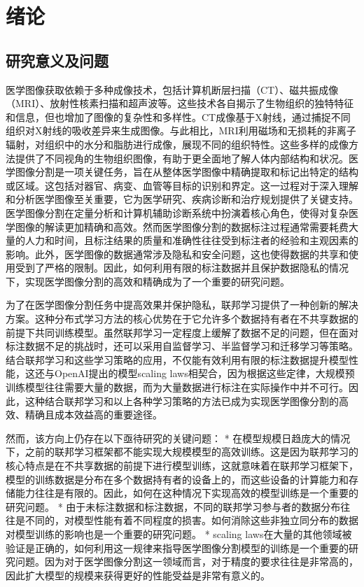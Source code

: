 \chapter{绪论}
\label{chap:intro}
\section{研究意义及问题}

医学图像获取依赖于多种成像技术，包括计算机断层扫描（CT）\supercite{Ludwig2008,JournalNucMedTech2023}、磁共振成像（MRI）、放射性核素扫描和超声波等。这些技术各自揭示了生物组织的独特特征和信息，但也增加了图像的复杂性和多样性。CT成像基于X射线，通过捕捉不同组织对X射线的吸收差异来生成图像。与此相比，MRI利用磁场和无损耗的非离子辐射，对组织中的水分和脂肪进行成像，展现不同的组织特性。这些多样的成像方法提供了不同视角的生物组织图像，有助于更全面地了解人体内部结构和状况。医学图像分割是一项关键任务，旨在从整体医学图像中精确提取和标记出特定的结构或区域。这包括对器官、病变、血管等目标的识别和界定。这一过程对于深入理解和分析医学图像至关重要，它为医学研究、疾病诊断和治疗规划提供了关键支持。医学图像分割在定量分析和计算机辅助诊断系统中扮演着核心角色，使得对复杂医学图像的解读更加精确和高效。然而医学图像分割的数据标注过程通常需要耗费大量的人力和时间，且标注结果的质量和准确性往往受到标注者的经验和主观因素的影响。此外，医学图像的数据通常涉及隐私和安全问题，这也使得数据的共享和使用受到了严格的限制。因此，如何利用有限的标注数据并且保护数据隐私的情况下，实现医学图像分割的高效和精确成为了一个重要的研究问题。

为了在医学图像分割任务中提高效果并保护隐私，联邦学习提供了一种创新的解决方案。这种分布式学习方法的核心优势在于它允许多个数据持有者在不共享数据的前提下共同训练模型。虽然联邦学习一定程度上缓解了数据不足的问题，但在面对标注数据不足的挑战时，还可以采用自监督学习、半监督学习和迁移学习等策略。结合联邦学习和这些学习策略的应用，不仅能有效利用有限的标注数据提升模型性能，这还与OpenAI提出的模型scaling laws相契合，因为根据这些定律，大规模预训练模型往往需要大量的数据，而为大量数据进行标注在实际操作中并不可行。因此，这种结合联邦学习和以上各种学习策略的方法已成为实现医学图像分割的高效、精确且成本效益高的重要途径。

然而，该方向上仍存在以下亟待研究的关键问题：
* 在模型规模日趋庞大的情况下，之前的联邦学习框架都不能实现大规模模型的高效训练。这是因为联邦学习的核心特点是在不共享数据的前提下进行模型训练，这就意味着在联邦学习框架下，模型的训练数据是分布在多个数据持有者的设备上的，而这些设备的计算能力和存储能力往往是有限的。因此，如何在这种情况下实现高效的模型训练是一个重要的研究问题。
* 由于未标注数据和标注数据，不同的联邦学习参与者的数据分布往往是不同的，对模型性能有着不同程度的损害。如何消除这些非独立同分布的数据对模型训练的影响也是一个重要的研究问题。
* scaling laws在大量的其他领域被验证是正确的，如何利用这一规律来指导医学图像分割模型的训练是一个重要的研究问题。因为对于医学图像分割这一领域而言，对于精度的要求往往是非常高的，因此扩大模型的规模来获得更好的性能受益是非常有意义的。


